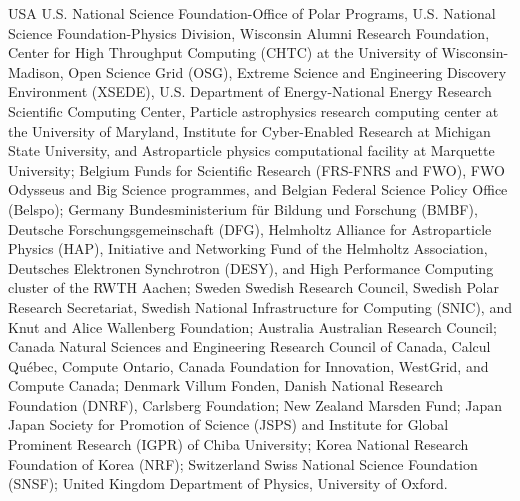 USA {\textendash} U.S. National Science Foundation-Office of Polar Programs,
U.S. National Science Foundation-Physics Division,
Wisconsin Alumni Research Foundation,
Center for High Throughput Computing (CHTC) at the University of Wisconsin-Madison,
Open Science Grid (OSG),
Extreme Science and Engineering Discovery Environment (XSEDE),
U.S. Department of Energy-National Energy Research Scientific Computing Center,
Particle astrophysics research computing center at the University of Maryland,
Institute for Cyber-Enabled Research at Michigan State University,
and Astroparticle physics computational facility at Marquette University;
Belgium {\textendash} Funds for Scientific Research (FRS-FNRS and FWO),
FWO Odysseus and Big Science programmes,
and Belgian Federal Science Policy Office (Belspo);
Germany {\textendash} Bundesministerium f{\"u}r Bildung und Forschung (BMBF),
Deutsche Forschungsgemeinschaft (DFG),
Helmholtz Alliance for Astroparticle Physics (HAP),
Initiative and Networking Fund of the Helmholtz Association,
Deutsches Elektronen Synchrotron (DESY),
and High Performance Computing cluster of the RWTH Aachen;
Sweden {\textendash} Swedish Research Council,
Swedish Polar Research Secretariat,
Swedish National Infrastructure for Computing (SNIC),
and Knut and Alice Wallenberg Foundation;
Australia {\textendash} Australian Research Council;
Canada {\textendash} Natural Sciences and Engineering Research Council of Canada,
Calcul Qu{\'e}bec, Compute Ontario, Canada Foundation for Innovation, WestGrid, and Compute Canada;
Denmark {\textendash} Villum Fonden, Danish National Research Foundation (DNRF), Carlsberg Foundation;
New Zealand {\textendash} Marsden Fund;
Japan {\textendash} Japan Society for Promotion of Science (JSPS)
and Institute for Global Prominent Research (IGPR) of Chiba University;
Korea {\textendash} National Research Foundation of Korea (NRF);
Switzerland {\textendash} Swiss National Science Foundation (SNSF);
United Kingdom {\textendash} Department of Physics, University of Oxford.